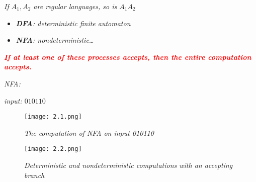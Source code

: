 \documentclass{article}
\begin{document}
\begin{thm}
    \textit{If $A_1,A_2$ are regular languages, so is $A_1A_2$}

    \begin{itemize}
        \item \textit{\textbf{DFA}: deterministic finite automaton}
        \item \textit{\textbf{NFA}: nondeterministic\dots}
    \end{itemize}
    
    \textcolor{red}{\textbf{\textit{If at least one of these processes accepts, then the entire computation accepts.}}}
    \begin{example}
        \textit{NFA:\\}

        \textit{input: $010110$\\}
        \begin{figure}[htbp]
            \centering \texttt{[image: 2.1.png]}
            \caption{\textit{The computation of NFA on input 010110}}
        \end{figure}

        \begin{figure}
            \centering \texttt{[image: 2.2.png]}
            \caption{\textit{Deterministic and nondeterministic computations with an accepting branch}}
        \end{figure}
          
    \end{example}
\end{thm}
\end{document}
